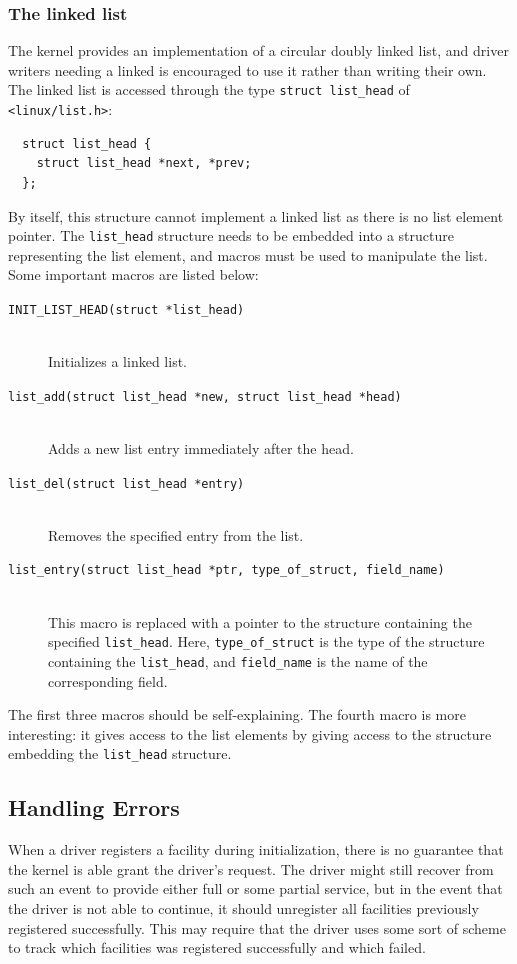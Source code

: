 \subsubsection{The linked list}
The kernel provides an implementation of a circular doubly linked list, and driver writers needing a linked is encouraged to use it rather than writing their own. The linked list is accessed through the type \texttt{struct list\_head} of \texttt{<linux/list.h>}:
\begin{verbatim}
  struct list_head {
    struct list_head *next, *prev;
  };
\end{verbatim}
By itself, this structure cannot implement a linked list as there is no list element pointer. The \texttt{list\_head} structure needs to be embedded into a structure representing the list element, and macros must be used to manipulate the list. Some important macros are listed below:
\begin{description}
  \item[\texttt{INIT\_LIST\_HEAD(struct *list\_head)}] \hfill \\
    Initializes a linked list.  
  \item[\texttt{list\_add(struct list\_head *new, struct list\_head *head)}] \hfill \\
    Adds a new list entry immediately after the head.
  \item[\texttt{list\_del(struct list\_head *entry)}] \hfill \\
    Removes the specified entry from the list.
  \item[\texttt{list\_entry(struct list\_head *ptr, type\_of\_struct, field\_name)}] \hfill \\
    This macro is replaced with a pointer to the structure containing the specified \texttt{list\_head}. Here, \texttt{type\_of\_struct} is the type of the structure containing the \texttt{list\_head}, and \texttt{field\_name} is the name of the corresponding field.
\end{description}
The first three macros should be self-explaining. The fourth macro is more interesting: it gives access to the list elements by giving access to the structure embedding the \texttt{list\_head} structure.


\subsection{Handling Errors}
When a driver registers a facility during initialization, there is no guarantee that the kernel is able grant the driver's request. The driver might still recover from such an event to provide either full or some partial service, but in the event that the driver is not able to continue, it should unregister all facilities previously registered successfully. This may require that the driver uses some sort of scheme to track which facilities was registered successfully and which failed. 


